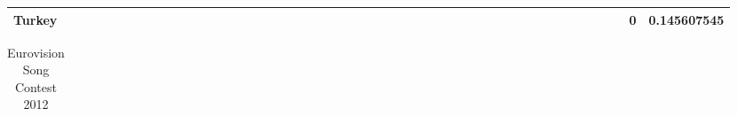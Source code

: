 \documentclass[a4paper,11pt]{report}
\begin{document}
\begin{appendices}
\begin{landscape}
\begin{longtable}{r|r|r|r|r|r|r|r|r|r|r|r|r|r|r|r|r|r|r|r|r|r|r|r|r|r|r|r|r|r|r|r|r|r|r|r|r|r|r|r|r|r|r|r|r|r|r|r|}
\multicolumn{1}{|r|}{\textbf{Turkey}}                &                  &                  &                  &                     &                  &                  &                                &                   &                  &                 &                  &                  &                           &                  &                 &                  &                  &                 &                  &                  &                  &                 &                &                 &                    &                &                  &                 &                 &                   &                  &                 &                     &                 &                   &                   &                &                 &                      &                          &                 &                  &                         &                 &                & 0                        & 0.145607545        \\ \hline
\end{longtable}
\footnotesize
\begin{longtable}{r|r|r|r|r|r|r|r|r|r|r|r|r|r|r|r|r|r|r|r|r|r|r|r|r|r|r|r|r|r|r|r|r|r|r|r|r|r|r|r|r|r|r|r|r|r|r|}
\caption{Eurovision Song Contest 2012}\\
\cline{2-47} 

\end{longtable}
\end{landscape}
\end{appendices}
\end{document}
